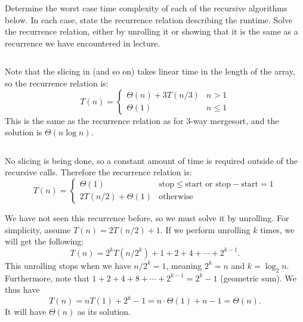 \begin{prob}
    Determine the worst case time complexity of each of the recursive algorithms below.
    In each case, state the recurrence relation describing the runtime. Solve the recurrence
    relation, either by unrolling it or showing that it is the same as a recurrence we have
    encountered in lecture.

    \begin{subprobset}
        \begin{subprob}
            \inputminted{python}{\thisdir/include/part_a.py}

            \begin{soln}
                Note that the slicing in  (and so on) takes linear time
                in the length of the array, so the recurrence relation is:
                \[
                    T(n) = \begin{cases} 
                        \Theta(n) + 3 T(n/3) & n > 1 \\
                        \Theta(1) & n \leq 1
                     \end{cases}
                \]
                This is the same as the  recurrence relation as for 3-way mergesort, and the solution
                is $\Theta(n \log n)$.
            \end{soln}
        \end{subprob}


        \begin{subprob}

            \inputminted{python}{\thisdir/include/part_b.py}

            \begin{soln}
                No slicing is being done, so a constant amount of time is required outside
                of the recursive calls. Therefore the recurrence relation is:
                \[
                    T(n) = \begin{cases} 
                        \Theta(1) & \text{stop} \leq \text{start or stop} - \text{start} = 1 \\
                        2T(n/2) + \Theta(1) & \text{otherwise}
                     \end{cases}
                \]

                We have not seen this recurrence before, so we must solve it by unrolling. 
                For simplicity, assume $T(n)= 2T(n/2) + 1$. 
                If we perform unrolling $k$ times, we will get the following: 
                \[ T(n) = 2^k T(n/2^k) + 1 + 2 + 4 + \cdots + 2^{k-1}.
                \] 
                This unrolling stops when we have $n / 2^k = 1$, meaning $2^k = n$ and $k = \log_2 n$. 
                Furthermore, note that $1 + 2 + 4 + 8 + \cdots + 2^{k-1} = 2^k - 1$ (geometric sum). 
                We thus have 
                \[ T(n) = n T(1) + 2^k  - 1 = n \cdot \Theta(1) + n - 1 = \Theta(n). \] 
                It will have $\Theta(n)$ as its solution.


\end{soln}
\end{subprob}
\end{subprobset}
\end{prob}
